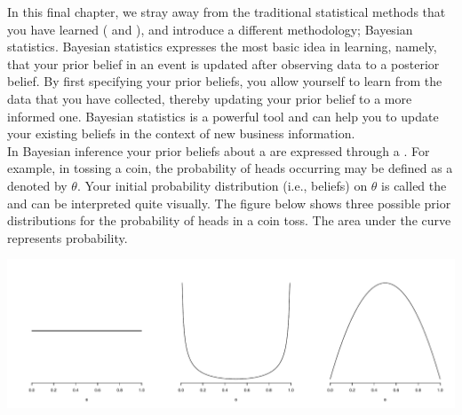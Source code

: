 \setcounter{section}{8}
\setcounter{subsection}{1}
\setcounter{question}{0}
\setcounter{hint}{0} %



In this final chapter, we stray away from the traditional statistical methods that you have learned ( and ), and introduce a different methodology; Bayesian statistics. Bayesian statistics expresses the most basic idea in learning, namely, that your prior belief in an event is updated after observing data to a posterior belief. By first specifying your prior beliefs, you allow yourself to learn from the data that you have collected, thereby updating your prior belief to a more informed one. Bayesian statistics is a powerful tool and can help you to update your existing beliefs in the context of new business information. \\

In Bayesian inference your prior beliefs about a  are expressed through a . For example, in tossing a coin, the probability of heads occurring may be defined as a  denoted by $\theta$. Your initial probability distribution (i.e., beliefs) on $\theta$ is called the  and can be interpreted quite visually. The figure below shows three possible prior distributions for the probability of heads in a coin toss. The area under the curve represents probability.

\begin{center}
    \includegraphics[width=\textwidth]{Files/Images/priorDistributions.pdf}
\end{center}


